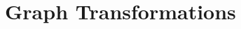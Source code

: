 \documentclass[../../main.tex]{subfiles}
\begin{document}
\chapter{Graph Transformations}
\end{document}
